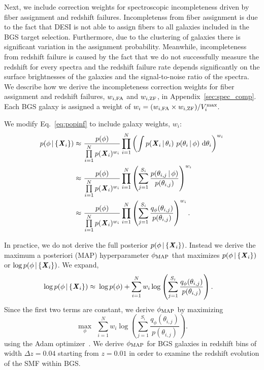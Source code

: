 Next, we include correction weights for spectroscopic incompleteness driven by
fiber assignment and redshift failures. 
Incompletenss from fiber assignment is due to the fact that DESI is not able to
assign fibers to all galaxies included in the BGS target selection. 
Furthermore, due to the clustering of galaxies there is significant variation
in the assignment probability. 
Meanwhile, incompleteness from redshift failure is caused by the fact that we
do not successfully measure the redshift for every spectra and the redshift
failure rate depends significantly on the surface brightnesses of the galaxies
and the signal-to-noise ratio of the spectra. 
We describe how we derive  the incompleteness correction weights for fiber
assignment and redshift failures, $w_{i, {\rm FA}}$ and $w_{i, {\rm ZF}}$, in
Appendix~\ref{sec:spec_comp}. 
Each BGS galaxy is assigned a weight of 
$w_i = (w_{i, {\rm FA}}\times w_{i, {\rm ZF}})/V^{\rm max}_i$.

We modify Eq.~\ref{eq:popinf} to include galaxy weights, $w_i$: 
\begin{align}
p(\phi \,|\, \{{\textbf{\textit{X}}_i}\}) 
    \approx&~\frac{p(\phi)}{\prod\limits_{i=1}^N p({\textbf{\textit{X}}_i})^{w_i}} 
    \prod\limits_{i=1}^N \left(\int p({\textbf{\textit{X}}_i} \,|\, \theta_i)~p(\theta_i \,|\, \phi)~{\rm d}\theta_i \right)^{w_i} \\ 
    \approx&~\frac{p(\phi)}{\prod\limits_{i=1}^N p({\textbf{\textit{X}}_i})^{w_i}} 
    \prod\limits_{i=1}^N \left( \sum\limits_{j=1}^{S_i}
    \frac{p(\theta_{i,j} \,|\, \phi)}{p(\theta_{i,j})} \right)^{w_i} \\
    \approx&~\frac{p(\phi)}{\prod\limits_{i=1}^N p({\textbf{\textit{X}}_i})^{w_i}} 
    \prod\limits_{i=1}^N \left( \sum\limits_{j=1}^{S_i}
    \frac{q_\phi(\theta_{i,j})}{p(\theta_{i,j})} \right)^{w_i}.
\end{align} 

In practice, we do not derive the full posterior 
$p(\phi \,|\, \{{\textbf{\textit{X}}_i}\})$. 
Instead we derive the maximum a posteriori (MAP) hyperparameter 
$\phi_{\rm MAP}$ that maximizes $p(\phi \,|\, \{{\textbf{\textit{X}}_i}\})$ or 
$\log p(\phi \,|\, \{{\textbf{\textit{X}}_i}\})$.
We expand, 
\begin{align}
\log p(\phi \given \{{\bfi X_i}\}) 
    \approx&~\log p(\phi) + %
    \sum\limits_{i=1}^N w_i \log \left(\sum\limits_{j=1}^{S_i} \frac{q_\phi(\theta_{i,j})}{p(\theta_{i,j})} \right).
\end{align} 
Since the first two terms are constant, we derive $\phi_{\rm MAP}$ by
maximizing 
\begin{equation}
    \max_\phi~~\sum\limits_{i=1}^N w_i \log \left(\sum\limits_{j=1}^{S_i} \frac{q_\phi(\theta_{i,j})}{p(\theta_{i,j})} \right).
\end{equation}
using the {\sc Adam} optimizer~\citep{kingma2017}.  
We derive $\phi_{\rm MAP}$ for BGS galaxies in redshift bins of width 
$\Delta z = 0.04$ starting from $z =0.01$ in order to examine the redshift
evolution of the SMF within BGS. 

